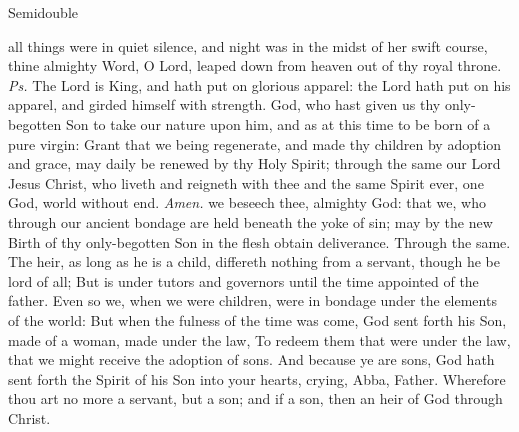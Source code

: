 \begin{inhead}
{Semidouble}
\end{inhead}
\par\noindent
{}


\properantiphonfix

\introit
{} all things were in quiet silence, and night was in the midst of her swift course, thine almighty Word, O Lord, leaped down from heaven out of thy royal throne. \textit{Ps.} The Lord is King, and hath put on glorious apparel: the Lord hath put on his apparel, and girded himself with strength.
\collect
{} God, who hast given us thy only-begotten Son to take our nature upon him, and as at this time to be born of a pure virgin: Grant that we being regenerate, and made thy children by adoption and grace, may daily be renewed by thy Holy Spirit; through the same our Lord Jesus Christ, who liveth and reigneth with thee and the same Spirit ever, one God, world without end. \textit{Amen.}
 we beseech thee, almighty God: that we, who through our ancient bondage are held beneath the yoke of sin; may by the new Birth of thy only-begotten Son in the flesh obtain deliverance. Through the same.
 The heir, as long as he is a child, differeth nothing from a servant, though he be lord of all; But is under tutors and governors until the time appointed of the father. Even so we, when we were children, were in bondage under the elements of the world: But when the fulness of the time was come, God sent forth his Son, made of a woman, made under the law, To redeem them that were under the law, that we might receive the adoption of sons. And because ye are sons, God hath sent forth the Spirit of his Son into your hearts, crying, Abba, Father. Wherefore thou art no more a servant, but a son; and if a son, then an heir of God through Christ.

